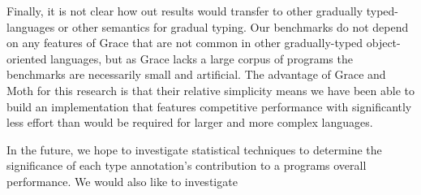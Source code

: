 \documentclass[sigplan,10pt,review,screen]{acmart}\settopmatter{printfolios=true}
\begin{document}
Finally, it is not clear how out results would transfer
to other gradually typed-languages or other semantics for gradual typing.
Our benchmarks do not depend on any features of Grace
that are not common in other gradually-typed object-oriented
languages, but as Grace lacks a large corpus of programs the
benchmarks are necessarily small and artificial.
The advantage of Grace and Moth for this research is
that their relative simplicity means we have been able to build an
implementation that features competitive performance with significantly less
effort than would be required for larger and more complex languages.

In the future, we hope to investigate statistical techniques to
determine the significance of each type annotation's contribution to a
programs overall performance. We would also like to investigate 



\end{document}
